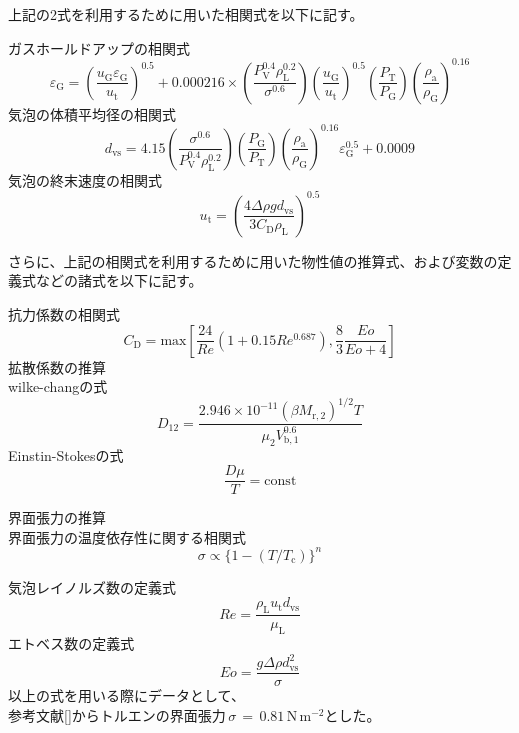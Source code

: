 \documentclass[a4j]{jsreport}
\begin{document}
上記の2式を利用するために用いた相関式を以下に記す。

ガスホールドアップの相関式
\begin{equation}
    \varepsilon_{\mathrm{ G}} = (\frac{u_{\mathrm{ G}}\varepsilon_{\mathrm{ G}}}{u_{\mathrm{ t}}}) ^{0.5} + 0.000216 \times(\frac{P_{\mathrm{ V}}^{0.4} \rho_{\mathrm{ L}}^{0.2} }{ \sigma^{0.6}})(\frac{u_{\mathrm{ G}}}{u_{\mathrm{ t}}})^{0.5}(\frac{P_{\mathrm{ T}}}{P_{\mathrm{ G}}})(\frac{\rho_{\mathrm{ a}}}{\rho_{\mathrm{ G}}})^{0.16}
\end{equation}
気泡の体積平均径の相関式
\begin{equation}
    d_{\mathrm{ vs}} = 4.15 (\frac{\sigma^{0.6}}{P_{\mathrm{ V}}^{0.4} \rho_{\mathrm{ L}}^{0.2}})(\frac{P_{\mathrm{ G}}}{P_{\mathrm{ T}}})(\frac{\rho_{\mathrm{ a}}}{\rho_{\mathrm{ G}}})^{0.16} \varepsilon_{\mathrm{ G}}^{0.5} + 0.0009
\end{equation}
気泡の終末速度の相関式
\begin{equation}
    u_{\mathrm{ t}} = (\frac{4\Delta \rho g d_{\mathrm{ vs}}}{3C_{\mathrm{ D}}\rho_{\mathrm{ L}}})^{0.5}
\end{equation}

さらに、上記の相関式を利用するために用いた物性値の推算式、および変数の定義式などの諸式を以下に記す。

抗力係数の相関式
\begin{equation}
    C_{\mathrm{ D}} = \mathrm{ max}[\frac{24}{Re}(1+0.15Re^{0.687}), \frac{8}{3}\frac{Eo}{Eo+4}]
\end{equation}
拡散係数の推算\\
wilke-changの式
\begin{equation}
    D_{12} = \frac{2.946\times 10^{-11}(\beta M_{\mathrm{ r,2}})^{1/2} T} {\mu_2 V_{\mathrm{ b,1}}^{0.6}}
\end{equation}
Einstin-Stokesの式
\begin{equation}
    \frac{D \mu}{T} = \mathrm{ const}
\end{equation}

界面張力の推算\\
界面張力の温度依存性に関する相関式
\begin{equation}
    \sigma \propto \{1-(T/T_{\mathrm{ c}}) \}^n    
\end{equation}

気泡レイノルズ数の定義式
\begin{equation}
    Re = \frac{\rho_{\mathrm{ L}}u_{\mathrm{ t}}d_{\mathrm{ vs}}}{\mu_{\mathrm{ L}}}
\end{equation}
エトベス数の定義式
\begin{equation}
    Eo = \frac{g \Delta \rho d_{\mathrm{ vs}}^2}{\sigma}
\end{equation}
以上の式を用いる際にデータとして、\\
参考文献[]からトルエンの界面張力\,$\sigma\,=\,0.81\,\mathrm{ N\,m^{-2}}$とした。
\end{document}
